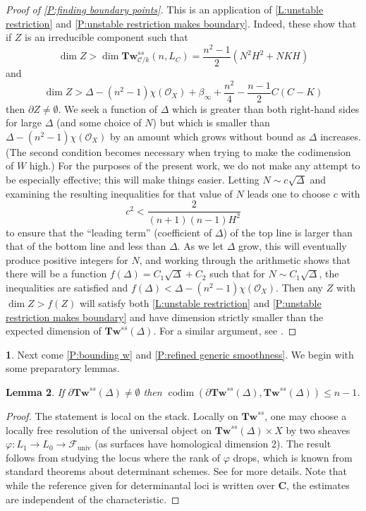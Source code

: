 \documentclass[11pt]{amsart}
\newcommand{\field}[1]{\mathbf #1}
\newcommand{\ms}[1]{\mathscr #1}
\newcommand{\C}{\field C}
\renewcommand{\phi}{\varphi}
\renewcommand{\[}{[\!\hspace{0.03em}[}
\renewcommand{\]}{]\!\hspace{0.03em}]}
\renewcommand{\(}{(\!\hspace{0.03em}(}
\renewcommand{\)}{)\!\hspace{0.03em})}
\newcommand{\Tw}{\mathbf{Tw}}
\newtheorem{lem}{Lemma}[subsubsection]%
\theoremstyle{definition}
\newtheorem{para}[lem]{\indent}
\theoremstyle{remark}
\begin{document}
\begin{proof}[Proof of \ref{P:finding boundary points}] This is an 
application of \ref{L:unstable restriction} and \ref{P:unstable restriction 
makes boundary}.  Indeed, these show that if $Z$ is an irreducible 
component such that
$$\dim Z>\dim\Tw^{ss}_{\ms 
C/k}(n,L_{C})=\frac{n^{2}-1}{2}(N^{2}H^{2}+NKH)$$
and
$$\dim 
Z>\Delta-(n^{2}-1)\chi({\ms O}_{X})+\beta_{\infty}+\frac{n^{2}}{4}-\frac{n-1}{2}C(C-K)$$
then $\partial Z\neq\emptyset$.  We seek a function of $\Delta$ which 
is greater than both right-hand sides for large $\Delta$ (and some 
choice of $N$) but which is smaller than 
$\Delta-(n^{2}-1)\chi({\ms O}_{X})$ by an amount which grows without bound 
as $\Delta$ increases.  (The second condition becomes necessary when 
trying to make the codimension of $W$ high.)  For the purposes of the 
present work, we do not make any attempt to be especially effective; 
this will make things easier.  Letting $N\sim c\sqrt\Delta$ and examining 
the resulting inequalities for that value of $N$ leads one to choose 
$c$ with 
$$c^{2}<\frac{2}{(n+1)(n-1)H^{2}}$$
to ensure that the ``leading term'' (coefficient of $\Delta$) of the top 
line is larger than that of the bottom line and less than $\Delta$.  
As we let $\Delta$ grow, this will eventually produce positive 
integers for $N$, and working through the arithmetic shows that there 
will be a function $f(\Delta)=C_{1}\sqrt\Delta+C_{2}$ such that for 
$N\sim C_{1}\sqrt{\Delta}$, the inequalities are satisfied and 
$f(\Delta)<\Delta-(n^{2}-1)\chi({\ms O}_{X})$.  Then any $Z$ 
with $\dim Z> f(Z)$ will satisfy both \ref{L:unstable restriction} 
and \ref{P:unstable restriction makes boundary} and have dimension 
strictly smaller than the expected dimension of $\Tw^{ss}(\Delta)$.  
For a similar argument, see \cite[pp.\ 209-210]{h-l}.
\end{proof}

\begin{para} Next come \ref{P:bounding w} and \ref{P:refined generic 
smoothness}.  We begin with some 
preparatory lemmas.
\end{para}

\begin{lem}\label{L:boundary codimension} If 
$\partial\Tw^{ss}(\Delta)\neq\emptyset$ then 
$\operatorname{codim}(\partial\Tw^{ss}(\Delta),\Tw^{ss}(\Delta))\leq 
n-1$.
\end{lem}
\begin{proof} The statement is local on the stack.  Locally on $\Tw^{ss}$, one may 
choose a locally free resolution of the universal object on 
$\Tw^{ss}(\Delta)\times X$ by two sheaves $\phi:L_{1}\to L_{0}\to\ms 
F_{\text{univ}}$ (as surfaces have homological dimension 2).  The 
result follows from studying the locus where the rank of $\phi$ drops, 
which is known from standard theorems about determinant schemes.  See 
\cite[9.2.2]{h-l} for more details.  Note that while the reference given 
for determinantal loci is written over $\C$, the estimates are 
independent of the characteristic.
\end{proof}
\end{document}
